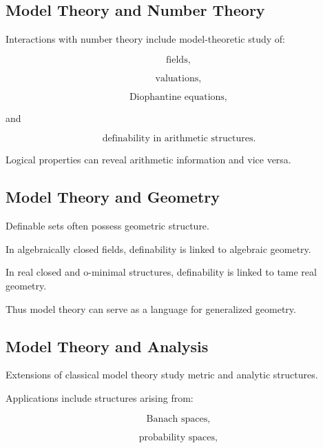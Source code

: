 \subsection{Model Theory and Number Theory}
\label{subsec:model-theory-number-theory}

Interactions with number theory include model-theoretic study of:

\[
\boxed{
\text{fields},
}
\]

\[
\boxed{
\text{valuations},
}
\]

\[
\boxed{
\text{Diophantine equations},
}
\]

and

\[
\boxed{
\text{definability in arithmetic structures}.
}
\]

Logical properties can reveal arithmetic information and vice versa.

\subsection{Model Theory and Geometry}
\label{subsec:model-theory-geometry}

Definable sets often possess geometric structure.

In algebraically closed fields, definability is linked to algebraic
geometry.

In real closed and o-minimal structures, definability is linked to tame
real geometry.

Thus model theory can serve as a language for generalized geometry.

\subsection{Model Theory and Analysis}
\label{subsec:model-theory-analysis}

Extensions of classical model theory study metric and analytic structures.

Applications include structures arising from:

\[
\boxed{
\text{Banach spaces},
}
\]

\[
\boxed{
\text{probability spaces},
}
\]

